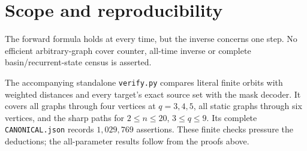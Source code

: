 \section{Scope and reproducibility}
The forward formula holds at every time, but the inverse concerns one step.
No efficient arbitrary-graph cover counter, all-time inverse or complete
basin/recurrent-state census is asserted.

The accompanying standalone \texttt{verify.py} compares literal finite
orbits with weighted distances and every target's exact source set with
the mask decoder. It covers all graphs through four vertices at
$q=3,4,5$, all static graphs through six vertices, and the sharp paths for
$2\le n\le20$, $3\le q\le9$. Its complete \texttt{CANONICAL.json} records
$1{,}029{,}769$ assertions. These finite checks pressure the deductions;
the all-parameter results follow from the proofs above.
